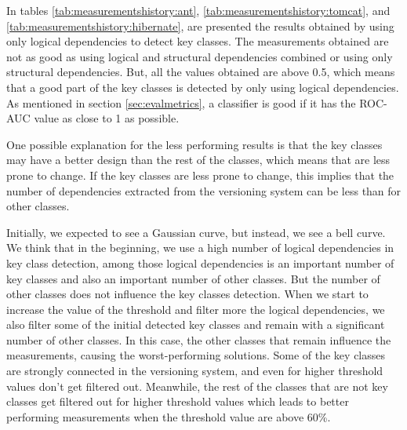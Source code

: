 \documentclass[runningheads]{comsis2}
\begin{document}
In tables \ref{tab:measurementshistory:ant}, \ref{tab:measurementshistory:tomcat}, and \ref{tab:measurementshistory:hibernate}, are presented the results obtained by using only logical dependencies to detect key classes. The measurements obtained are not as good as using logical and structural dependencies combined or using only structural dependencies. But, all the values obtained are above 0.5, which means that a good part of the key classes is detected by only using logical dependencies.  As mentioned in section \ref{sec:evalmetrics}, a classifier is good if it has the ROC-AUC value as close to 1 as possible. 


One possible explanation for the less performing results is that the key classes may have a better design than the rest of the classes, which means that are less prone to change. If the key classes are less prone to change, this implies that the number of dependencies extracted from the versioning system can be less than for other classes.

Initially, we expected to see a Gaussian curve, but instead, we see a bell curve.  We think that in the beginning, we use a high number of logical dependencies in key class detection, among those logical dependencies is an important number of key classes and also an important number of other classes. But the number of other classes does not influence the key classes detection. When we start to increase the value of the threshold and filter more the logical dependencies, we also filter some of the initial detected key classes and remain with a significant number of other classes. In this case, the other classes that remain influence the measurements, causing the worst-performing solutions. 
Some of the key classes are strongly connected in the versioning system, and even for higher threshold values don't get filtered out. Meanwhile, the rest of the classes that are not key classes get filtered out for higher threshold values which leads to better performing measurements when the threshold value are above 60\%. 
\end{document}
